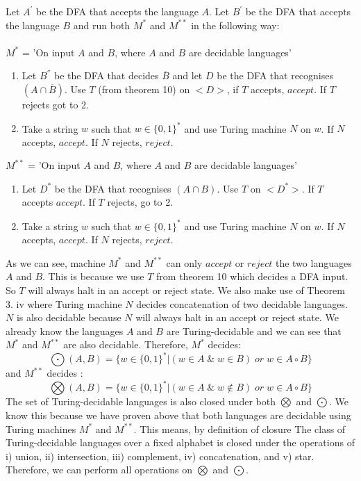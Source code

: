 \documentclass[a4paper,12pt]{article}
\begin{document}
\newpage
Let $A^{'}$ be the DFA that accepts the language $A$. Let $B^{'}$ be the DFA that accepts the language $B$ and run both $M^{*}$ and $M^{**}$ in the following way:\\
\\
$M^{*}$ = 'On input $A$ and $B$, where $A$ and $B$ are decidable languages'
\begin{enumerate}
\item Let $B^{''}$ be the DFA that decides $\overline{B}$ and let $D$ be the DFA that recognises $(A \cap \overline{B})$. Use $T$ (from theorem 10) on $<D>$, if $T$ accepts, $accept$. If $T$ rejects got to 2.
\item Take a string $w$ such that $w \in \{0,1\}^{*}$ and use Turing machine $N$ on $w$. If $N$ accepts, $accept$. If $N$ rejects, $reject$.
\end{enumerate} 
$M^{**}$ = 'On input $A$ and $B$, where $A$ and $B$ are decidable languages'
\begin{enumerate}
\item Let $D^{*}$ be the DFA that recognises $(A \cap B)$. Use $T$ on $<D^{*}>$. If $T$ accepts $accept$. If $T$ rejects, go to 2. 
\item Take a string $w$ such that $w \in \{0,1\}^{*}$ and use Turing machine $N$ on $w$. If $N$ accepts, $accept$. If $N$ rejects, $reject$.
\end{enumerate}
As we can see, machine $M^{*}$ and $M^{**}$ can only $accept$ or $reject$ the two languages $A$ and $B$. This is because we use $T$ from theorem 10 which decides a DFA input. So $T$ will always halt in an accept or reject state. We also make use of Theorem 3. iv where Turing machine $N$ decides concatenation of two decidable languages. $N$ is also decidable because $N$ will always halt in an accept or reject state. We already know the languages $A$ and $B$ are Turing-decidable and we can see that $M^{*}$ and $M^{**}$ are also decidable. Therefore, $M^{*}$ decides: $$\bigodot (A, B) = \{w \in \{0,1\}^{*} | (w \in A \; \& \; w \in B)\; or \; w \in A  \circ B \}$$
and $M^{**}$ decides :
$$\bigotimes (A, B) = \{w \in \{0,1\}^{*} | (w \in A \; \& \; w \notin B)\; or \; w \in A  \circ B \}$$
The set of Turing-decidable languages is also closed under both $\bigotimes$ and $\bigodot$. We know this because we have proven above that both languages are decidable using Turing machines $M^{*}$ and $M^{**}$. This means, by definition of closure The class of Turing-decidable languages over a fixed alphabet is closed under the operations of i) union, ii) intersection, iii) complement, iv) concatenation, and v) star. Therefore, we can perform all operations on $\bigotimes$ and $\bigodot$. 
\end{document}
